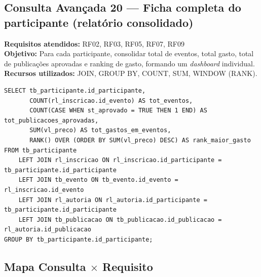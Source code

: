 \documentclass[12pt]{article}
\begin{document}
\subsection{Consulta Avançada 20 --- Ficha completa do participante (relatório consolidado)}
\textbf{Requisitos atendidos:} RF02, RF03, RF05, RF07, RF09 \\
\textbf{Objetivo:} Para cada participante, consolidar total de eventos, total gasto, total de publicações aprovadas e ranking de gasto, formando um \textit{dashboard} individual. \\
\textbf{Recursos utilizados:} JOIN, GROUP BY, COUNT, SUM, WINDOW (RANK).
\begin{lstlisting}[caption={QA20 --- Ficha completa do participante (relatório consolidado).}]
SELECT tb_participante.id_participante,
       COUNT(rl_inscricao.id_evento) AS tot_eventos,
       COUNT(CASE WHEN st_aprovado = TRUE THEN 1 END) AS tot_publicacoes_aprovadas,
       SUM(vl_preco) AS tot_gastos_em_eventos,
       RANK() OVER (ORDER BY SUM(vl_preco) DESC) AS rank_maior_gasto
FROM tb_participante
    LEFT JOIN rl_inscricao ON rl_inscricao.id_participante = tb_participante.id_participante
    LEFT JOIN tb_evento ON tb_evento.id_evento = rl_inscricao.id_evento
    LEFT JOIN rl_autoria ON rl_autoria.id_participante = tb_participante.id_participante
    LEFT JOIN tb_publicacao ON tb_publicacao.id_publicacao = rl_autoria.id_publicacao
GROUP BY tb_participante.id_participante;
\end{lstlisting}

\subsection{Mapa Consulta $\times$ Requisito}
\end{document}
